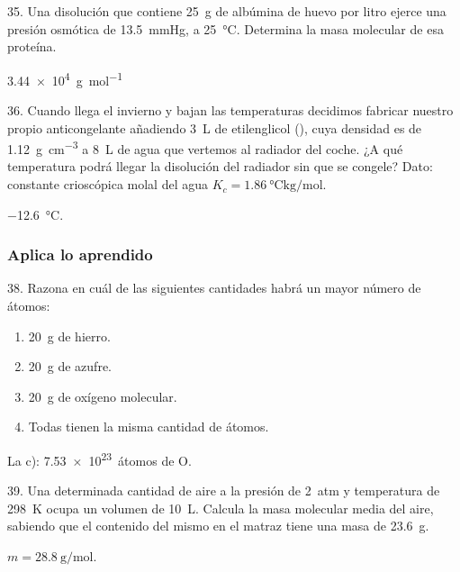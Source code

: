 \documentclass[11pt]{article}
\begin{document}
\begin{multicols}{2}
\begin{exercise}
  35. Una disolución que contiene \SI{25}{\gram} de albúmina de
  huevo por litro ejerce una presión osmótica de \SI{13.5}{\mmHg}, a
  \SI{25}{\celsius}. Determina la masa molecular de esa proteína.
\end{exercise}
\begin{solution}
  \SI{3.44e4}{\gram\per\mole}
\end{solution}

\begin{exercise}
  36. Cuando llega el invierno y bajan las temperaturas decidimos
  fabricar nuestro propio anticongelante añadiendo \SI{3}{\liter} de
  etilenglicol (), cuya densidad es de \SI{1.12}{\gram\per\cubic\centi\meter} a \SI{8}{\liter}
  de agua que vertemos al radiador del coche. ¿A qué temperatura
  podrá llegar la disolución del radiador sin que se congele?
  Dato: constante crioscópica molal del agua $K_c = \SI{1.86}{\celsius\kilo\gram\per\mole}$.
\end{exercise}
\begin{solution}
  \SI{-12.6}{\celsius}.
\end{solution}



\subsubsection{Aplica lo aprendido}

\begin{exercise}
  38. Razona en cuál de las siguientes cantidades habrá un mayor número de átomos:
  \begin{enumerate}
    \item \SI{20}{\gram} de hierro.
    \item \SI{20}{\gram} de azufre.
    \item \SI{20}{\gram} de oxígeno molecular.
    \item Todas tienen la misma cantidad de átomos.
  \end{enumerate}
\end{exercise}
\begin{solution}
  La c): \SI{7.53e23}{átomos} de O.
\end{solution}

\begin{exercise}
  39. Una determinada cantidad de aire a la presión de \SI{2}{atm} y
  temperatura de \SI{298}{\kelvin} ocupa un volumen de \SI{10}{\liter}. Calcula la masa molecular media del aire, sabiendo que el contenido del
  mismo en el matraz tiene una masa de \SI{23.6}{\gram}.
\end{exercise}
\begin{solution}
  $m = \SI{28.8}{\gram\per\mole}$.
\end{solution}


\end{multicols}
\end{document}
